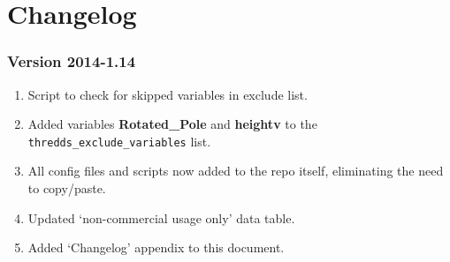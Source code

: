 \chapter{Changelog}
\subsection{Version 2014-1.14}
\begin{enumerate}
\item Script to check for skipped variables in exclude list.
\item Added variables \textbf{Rotated\_Pole} and \textbf{heightv} to the \texttt{thredds\_exclude\_variables} list.
\item All config files and scripts now added to the repo itself, eliminating the need to copy/paste.
\item Updated `non-commercial usage only' data table.
\item Added `Changelog' appendix to this document.
\end{enumerate}
